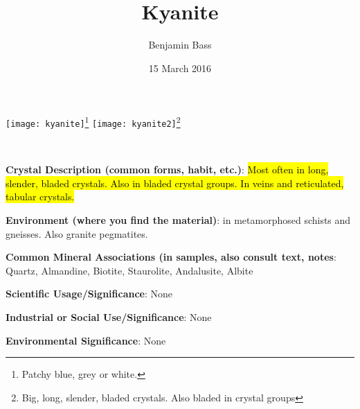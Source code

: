 \documentclass[10pt]{article}
\author{Benjamin Bass}
\date{15 March 2016}
\title{\vspace{-2.0cm} Kyanite} %
\begin{document}
\maketitle


\begin{center}
  \texttt{[image: kyanite]}\footnote{Patchy blue, grey or white.}
  \texttt{[image: kyanite2]}\footnote{Big, long, slender, bladed crystals. Also bladed in crystal groups}
\end{center}



\
\
\
\
\
\
\
\
\
\

\begin{framed}
  \textbf{Crystal Description (common forms, habit, etc.)}: \hl{Most often in long, slender, bladed crystals. Also in bladed crystal groups. In veins and reticulated, tabular crystals.}
\end{framed}

\begin{framed}
  \textbf{Environment (where you find the material)}: in metamorphosed schists and gneisses. Also granite pegmatites.
\end{framed}

\begin{framed}
  \textbf{Common Mineral Associations (in samples, also consult text, notes}: Quartz, Almandine, Biotite, Staurolite, Andalusite, Albite
\end{framed}

\begin{framed}
  \textbf{Scientific Usage/Significance}: None
\end{framed}

\begin{framed}
  \textbf{Industrial or Social Use/Significance}: None
\end{framed}

\begin{framed}
  \textbf{Environmental Significance}: None
\end{framed}

\end{document}
